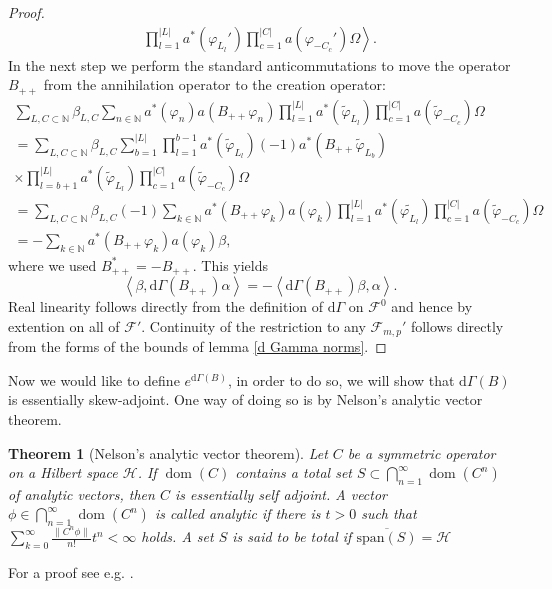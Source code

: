 \documentclass[b5paper,draft,openbib,12pt]{memoir}
\newtheorem{Thm}[Def]{Theorem}
\DeclareMathOperator{\dom}{dom}
\begin{document}
\begin{proof}
\begin{align}
\left.  \prod_{l=1}^{|L|}a^*(\varphi_{L_l}')\prod_{c=1}^{|C|} a(\varphi_{-C_c}')\Omega\right\rangle.
\end{align}
In the next step we perform the standard anticommutations to 
move the operator \(B_{++}\) from the annihilation operator to
the creation operator:
\begin{align}
  \sum_{L,C\subset \mathbb{N}}\beta_{L,C} \sum_{n\in\mathbb{N}}a^*(\varphi_n)a(B_{++}\varphi_n) \prod_{l=1}^{|L|}a^*(\tilde{\varphi}_{L_l})\prod_{c=1}^{|C|}a(\tilde{\varphi}_{-C_c})\Omega\\
  =\sum_{L,C\subset \mathbb{N}}\!\!\!\beta_{L,C}\!\sum_{b=1}^{|L|} \prod_{l=1}^{b-1}a^*(\tilde{\varphi}_{L_l}) (-1)a^*(B_{++}\tilde{\varphi}_{L_b})\\
  \times \prod_{l=b+1}^{|L|}a^*(\tilde{\varphi}_{L_l})\prod_{c=1}^{|C|}a(\tilde{\varphi}_{-C_c})\Omega\\
  =\sum_{L,C\subset \mathbb{N}}\beta_{L,C} (-1)\sum_{k\in\mathbb{N}}a^*(B_{++}\varphi_k)a(\varphi_k) \prod_{l=1}^{|L|}a^*(\tilde{\varphi_{L_l}})\prod_{c=1}^{|C|}a(\tilde{\varphi}_{-C_c})\Omega\\
  =-\sum_{k\in\mathbb{N}}a^*(B_{++}\varphi_k)a(\varphi_k)\beta,
\end{align}
where we used \(B_{++}^*=-B_{++}\).  
This yields
\begin{equation}
\left\langle \beta, \mathrm{d}\Gamma(B_{++})\alpha\right\rangle =- \left\langle \mathrm{d}\Gamma(B_{++})\beta, \alpha\right\rangle.
\end{equation}
Real linearity follows directly from the definition of 
\(\mathrm{d}\Gamma\) on \(\mathcal{F}^0\) and hence 
by extention on all of \(\mathcal{F}'\). Continuity 
of the restriction to any \(\mathcal{F}_{m,p}'\) follows 
directly from the forms of the bounds of lemma 
\ref{d Gamma norms}.
\end{proof}



Now we would like to define \(e^{\mathrm{d}\Gamma(B)}\), in order to do so, we will show that \(\mathrm{d}\Gamma(B)\) is essentially skew-adjoint. 
One way of doing so is by Nelson's analytic vector theorem. 

\begin{Thm}[Nelson's analytic vector theorem]
Let \(C\) be a symmetric operator on a Hilbert space \(\mathscr{H}\). If \(\dom(C)\) contains a total set 
\(S\subset \bigcap_{n=1}^\infty \dom(C^n)\) of analytic vectors, then \(C\) is essentially self adjoint. 
A vector \(\phi\in \bigcap_{n=1}^\infty \dom(C^n)\) is called analytic if there is \(t>0\) such that
\(\sum_{k=0}^\infty \frac{\|C^n \phi\|}{n!} t^n<\infty\) holds. A set \(S\) is said to be total if \(\overline{\text{span}(S)}=\mathscr{H}\)
\end{Thm}
For a proof see e.g. \cite{SimonReed2}.
\end{document}
